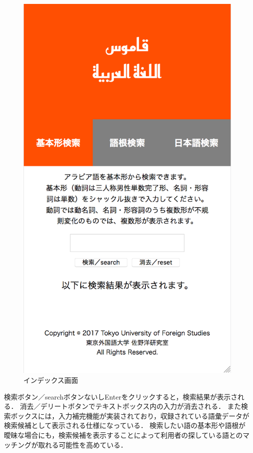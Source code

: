 \documentclass[technicalreport]{ieicej}
\begin{document}
\begin{figure}[H]
\begin{center}
\includegraphics[scale=0.4]{fig01.png}
\caption{インデックス画面}
\end{center}
\end{figure}

検索ボタン／searchボタンないしEnterをクリックすると，検索結果が表示される．
消去／デリートボタンでテキストボックス内の入力が消去される．
また検索ボックスには，入力補完機能が実装されており，収録されている語彙データが検索候補として表示される仕様になっている．
検索したい語の基本形や語根が曖昧な場合にも，検索候補を表示することによって利用者の探している語とのマッチングが取れる可能性を高めている．
\end{document}
